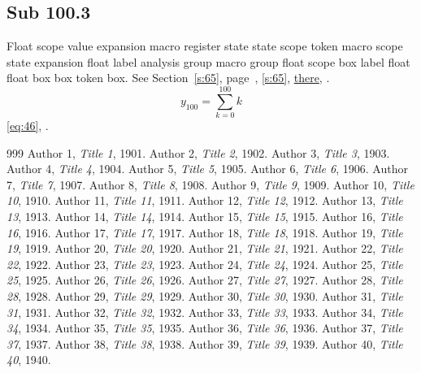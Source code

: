 \documentclass[11pt]{article}
\begin{document}
\subsection{Sub 100.3}\label{ss:100.3} Float scope value expansion macro register state state scope token macro scope state expansion float label analysis group macro group float scope box label float float box box token box. See Section~\ref{s:65}, page~\pageref{ss:88.1}, \cref{s:65}, \hyperref[s:25]{there}, \cite{k112,k82}.
\begin{equation}y_{100}=\sum_{k=0}^{100}k\label{eq:100}\end{equation} \eqref{eq:46}, .
\begin{thebibliography}{999}
 Author 1, \emph{Title 1}, 1901.
 Author 2, \emph{Title 2}, 1902.
 Author 3, \emph{Title 3}, 1903.
 Author 4, \emph{Title 4}, 1904.
 Author 5, \emph{Title 5}, 1905.
 Author 6, \emph{Title 6}, 1906.
 Author 7, \emph{Title 7}, 1907.
 Author 8, \emph{Title 8}, 1908.
 Author 9, \emph{Title 9}, 1909.
 Author 10, \emph{Title 10}, 1910.
 Author 11, \emph{Title 11}, 1911.
 Author 12, \emph{Title 12}, 1912.
 Author 13, \emph{Title 13}, 1913.
 Author 14, \emph{Title 14}, 1914.
 Author 15, \emph{Title 15}, 1915.
 Author 16, \emph{Title 16}, 1916.
 Author 17, \emph{Title 17}, 1917.
 Author 18, \emph{Title 18}, 1918.
 Author 19, \emph{Title 19}, 1919.
 Author 20, \emph{Title 20}, 1920.
 Author 21, \emph{Title 21}, 1921.
 Author 22, \emph{Title 22}, 1922.
 Author 23, \emph{Title 23}, 1923.
 Author 24, \emph{Title 24}, 1924.
 Author 25, \emph{Title 25}, 1925.
 Author 26, \emph{Title 26}, 1926.
 Author 27, \emph{Title 27}, 1927.
 Author 28, \emph{Title 28}, 1928.
 Author 29, \emph{Title 29}, 1929.
 Author 30, \emph{Title 30}, 1930.
 Author 31, \emph{Title 31}, 1931.
 Author 32, \emph{Title 32}, 1932.
 Author 33, \emph{Title 33}, 1933.
 Author 34, \emph{Title 34}, 1934.
 Author 35, \emph{Title 35}, 1935.
 Author 36, \emph{Title 36}, 1936.
 Author 37, \emph{Title 37}, 1937.
 Author 38, \emph{Title 38}, 1938.
 Author 39, \emph{Title 39}, 1939.
 Author 40, \emph{Title 40}, 1940.

\end{thebibliography}
\end{document}
